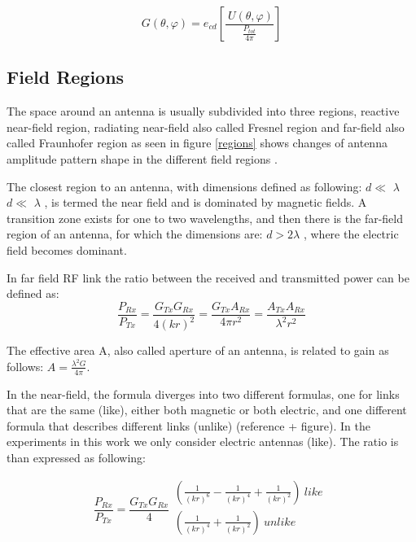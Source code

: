 \begin{equation}
G \left(  \theta , \varphi  \right) =e_{cd} \left[ \frac{~U \left(  \theta , \varphi  \right) }{\frac{P_{tot}}{4 \pi }} \right]
\end{equation}



\subsection{Field Regions}

The space around an antenna is usually subdivided into three regions, reactive near-field region, radiating near-field also called Fresnel region and far-field also called Fraunhofer region as seen in figure \ref{regions} shows changes of antenna amplitude pattern shape in the different field regions \cite{schantz}.

The closest region to an antenna, with dimensions defined as following: $d \ll $ $ \lambda $ $d \ll $ $ \lambda $ , is termed the near field and is dominated by magnetic fields. A transition zone exists for one to two wavelengths, and then there is the far-field region of an antenna, for which the dimensions are: $d>2\lambda $  , where the electric field becomes dominant.

In far field RF link the ratio between the received and transmitted power can be defined as:
\begin{equation}
\frac{P_{Rx}}{P_{Tx}}=\frac{G_{Tx}G_{Rx}}{4 \left( kr \right) ^{2}}=\frac{G_{Tx}A_{Rx}}{4 \pi r^{2}}=\frac{A_{Tx}A_{Rx}}{ \lambda ^{2}r^{2}} %
\end{equation}



The effective area A, also called aperture of an antenna, is related to gain as follows: $A=\frac{ \lambda ^{2}G}{4 \pi }$.

In the near-field, the formula diverges into two different formulas, one for links that are the same (like), either both magnetic or both electric, and one different formula that describes different links (unlike) (reference + figure). In the experiments in this work we only consider electric antennas (like). The ratio is than expressed as following:

\begin{equation}
\frac{P_{Rx}}{P_{Tx}}=\frac{G_{Tx}G_{Rx}}{4} \begin{array}{c}
	 \left( \frac{1}{ \left( kr \right) ^{6}}-\frac{1}{ \left( kr \right) ^{4}}+\frac{1}{ \left( kr \right) ^{2}} \right) ~like~\\
	 \left( \frac{1}{ \left( kr \right) ^{4}}+\frac{1}{ \left( kr \right) ^{2}} \right) ~unlike\\
	\end{array}%
\end{equation}
%


